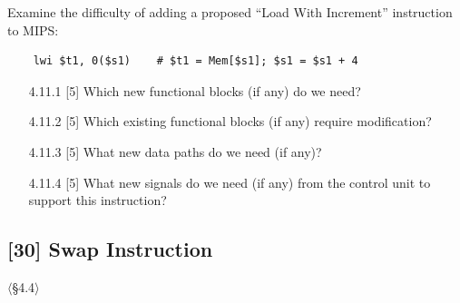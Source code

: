 \noindent Examine the difficulty of adding a proposed ``Load With Increment''
instruction to MIPS:
\begin{verbatim}
    lwi $t1, 0($s1)    # $t1 = Mem[$s1]; $s1 = $s1 + 4
\end{verbatim}

\begin{enumerate}
  \item[4.11.1] [5] Which new functional blocks (if any) do we need?
  \item[4.11.2] [5] Which existing functional blocks (if any) require
        modification?
  \item[4.11.3] [5] What new data paths do we need (if any)?
  \item[4.11.4] [5] What new signals do we need (if any) from the control
        unit to support this instruction?
\end{enumerate}

\problembreak

\subsection{[30] Swap Instruction}
\hypertarget{prob-4.12}{}
\noindent$\langle$\S4.4$\rangle$\medskip

